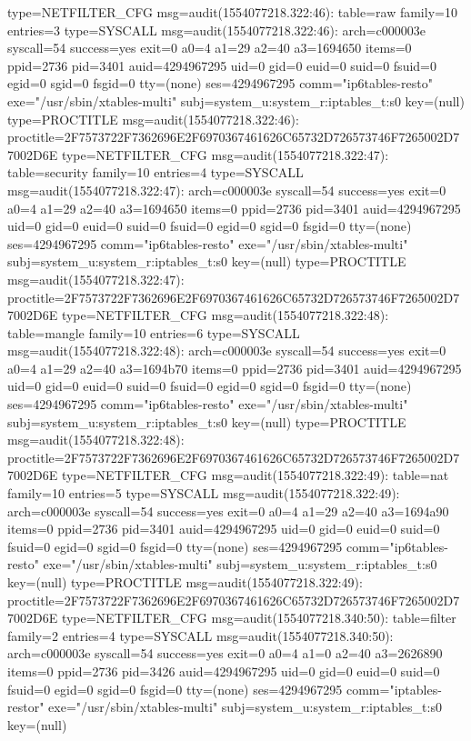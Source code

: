 \documentclass[]{report}
\newenvironment{Shaded}{}{}
\newcommand{\NormalTok}[1]{#1}
\begin{document}
\begin{Shaded}
\begin{Highlighting}[]
\NormalTok{type=NETFILTER_CFG msg=audit(1554077218.322:46): table=raw family=10 entries=3}
\NormalTok{type=SYSCALL msg=audit(1554077218.322:46): arch=c000003e syscall=54 success=yes exit=0 a0=4 a1=29 a2=40 a3=1694650 items=0 ppid=2736 pid=3401 auid=4294967295 uid=0 gid=0 euid=0 suid=0 fsuid=0 egid=0 sgid=0 fsgid=0 tty=(none) ses=4294967295 comm="ip6tables-resto" exe="/usr/sbin/xtables-multi" subj=system_u:system_r:iptables_t:s0 key=(null)}
\NormalTok{type=PROCTITLE msg=audit(1554077218.322:46): proctitle=2F7573722F7362696E2F6970367461626C65732D726573746F7265002D77002D6E}
\NormalTok{type=NETFILTER_CFG msg=audit(1554077218.322:47): table=security family=10 entries=4}
\NormalTok{type=SYSCALL msg=audit(1554077218.322:47): arch=c000003e syscall=54 success=yes exit=0 a0=4 a1=29 a2=40 a3=1694650 items=0 ppid=2736 pid=3401 auid=4294967295 uid=0 gid=0 euid=0 suid=0 fsuid=0 egid=0 sgid=0 fsgid=0 tty=(none) ses=4294967295 comm="ip6tables-resto" exe="/usr/sbin/xtables-multi" subj=system_u:system_r:iptables_t:s0 key=(null)}
\NormalTok{type=PROCTITLE msg=audit(1554077218.322:47): proctitle=2F7573722F7362696E2F6970367461626C65732D726573746F7265002D77002D6E}
\NormalTok{type=NETFILTER_CFG msg=audit(1554077218.322:48): table=mangle family=10 entries=6}
\NormalTok{type=SYSCALL msg=audit(1554077218.322:48): arch=c000003e syscall=54 success=yes exit=0 a0=4 a1=29 a2=40 a3=1694b70 items=0 ppid=2736 pid=3401 auid=4294967295 uid=0 gid=0 euid=0 suid=0 fsuid=0 egid=0 sgid=0 fsgid=0 tty=(none) ses=4294967295 comm="ip6tables-resto" exe="/usr/sbin/xtables-multi" subj=system_u:system_r:iptables_t:s0 key=(null)}
\NormalTok{type=PROCTITLE msg=audit(1554077218.322:48): proctitle=2F7573722F7362696E2F6970367461626C65732D726573746F7265002D77002D6E}
\NormalTok{type=NETFILTER_CFG msg=audit(1554077218.322:49): table=nat family=10 entries=5}
\NormalTok{type=SYSCALL msg=audit(1554077218.322:49): arch=c000003e syscall=54 success=yes exit=0 a0=4 a1=29 a2=40 a3=1694a90 items=0 ppid=2736 pid=3401 auid=4294967295 uid=0 gid=0 euid=0 suid=0 fsuid=0 egid=0 sgid=0 fsgid=0 tty=(none) ses=4294967295 comm="ip6tables-resto" exe="/usr/sbin/xtables-multi" subj=system_u:system_r:iptables_t:s0 key=(null)}
\NormalTok{type=PROCTITLE msg=audit(1554077218.322:49): proctitle=2F7573722F7362696E2F6970367461626C65732D726573746F7265002D77002D6E}
\NormalTok{type=NETFILTER_CFG msg=audit(1554077218.340:50): table=filter family=2 entries=4}
\NormalTok{type=SYSCALL msg=audit(1554077218.340:50): arch=c000003e syscall=54 success=yes exit=0 a0=4 a1=0 a2=40 a3=2626890 items=0 ppid=2736 pid=3426 auid=4294967295 uid=0 gid=0 euid=0 suid=0 fsuid=0 egid=0 sgid=0 fsgid=0 tty=(none) ses=4294967295 comm="iptables-restor" exe="/usr/sbin/xtables-multi" subj=system_u:system_r:iptables_t:s0 key=(null)}

\end{Highlighting}
\end{Shaded}
\end{document}
